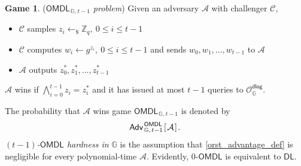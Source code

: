 \documentclass[psamsfonts, reqno]{amsart}
\theoremstyle{definition}
\newtheorem{attack_game}[thm]{Game}
\theoremstyle{remark}
\numberwithin{equation}{section}
\begin{document}
\begin{attack_game}\label{omdl_attack}
(\textit{\textup{$\mathsf{OMDL}_{\hspace{1pt}\mathbb{G},\hspace{1pt} t-1}$} problem})
Given an adversary $\mathcal{A}$ with challenger $\mathcal{C}$,\vspace{5pt}
\begin{itemize}[label=$\circ$,leftmargin=17pt]
	\item
		$\mathcal{C}$ samples $z_i \leftarrow_\$ \mathbb{Z}_q,
		\ 0 \le i \le t-1$\vspace{5pt}
	\item
		$\mathcal{C}$ computes $w_i \leftarrow g ^ {z_i},
		\ 0 \le i \le t-1$ and sends $w_0, w_1, \dots, w_{t-1}$
		to $\mathcal{A}$\vspace{5pt}
	\item
		$\mathcal{A}$ outputs $z_0^*, z_1^*, \dots, z_{t-1}^*$\vspace{4pt}
\end{itemize}
\hspace*{0pt}%
\begin{minipage}{\dimexpr\textwidth-\parindent\relax}%
	\hspace{8pt}$\mathcal{A}$ wins if\hspace{0pt}
	$\bigwedge\limits_{i=0}^{t-1} z_i = z_i^*$
	and it has issued at most $t-1$ queries to
	$\mathcal{O}_{\mathbb{G}}^{\mathsf{dlog}}$.
\end{minipage}%
\vspace{5pt}
\end{attack_game}

\noindent
The probability that $\mathcal{A}$
wins game $\mathsf{OMDL}_{\hspace{1pt}\mathbb{G},\hspace{1pt}t-1}$
is denoted by
\vspace{5pt}
\begin{equation}\label{orst_advantage_def}
\mathsf{Adv}
	_{\hspace{1pt}\mathbb{G},\hspace{1pt} t-1}
	^{\hspace{1pt}\mathsf{OMDL}}
	\hspace{1pt}
		[\hspace{1pt}
			\mathcal{A}
		\hspace{1pt}]\hspace{1pt}.
\hspace{1pt}
\vspace{5pt}
\end{equation}
\textit{$(t-1)$-$\mathsf{OMDL}$ hardness in $\mathbb{G}$}
is the assumption that \eqref{orst_advantage_def}
is negligible for every polynomial-time $\mathcal{A}$.
Evidently, $0$-$\mathsf{OMDL}$
is equivalent to $\mathsf{DL}$.
\end{document}
